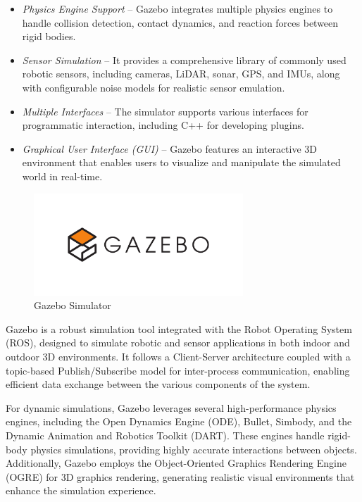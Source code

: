 \documentclass[../../main]{subfiles}
\begin{document}
\begin{itemize}
    \item \emph{Physics Engine Support} – Gazebo integrates multiple physics engines to handle collision detection, contact dynamics, and reaction forces between rigid bodies.
    \item \emph{Sensor Simulation} – It provides a comprehensive library of commonly used robotic sensors, including cameras, LiDAR, sonar, GPS, and IMUs, 
    along with configurable noise models for realistic sensor emulation.
    \item \emph{Multiple Interfaces} – The simulator supports various interfaces for programmatic interaction, including C++ for developing plugins.
    \item \emph{Graphical User Interface (GUI)} – Gazebo features an interactive 3D environment that enables users to visualize and manipulate the simulated world in real-time.
\end{itemize}

\begin{figure}[H]
    \centering
\includegraphics[width=0.7\textwidth]{fig/gazebo_logo.png}
\caption{Gazebo Simulator}
\label{Gazebo logo} %
\end{figure}
\newpage
Gazebo is a robust simulation tool integrated with the Robot Operating System (ROS),
designed to simulate robotic and sensor applications in both indoor and outdoor 3D environments. 
It follows a Client-Server architecture coupled with a topic-based Publish/Subscribe model for inter-process communication, 
enabling efficient data exchange between the various components of the system.

For dynamic simulations, Gazebo leverages several high-performance physics engines, 
including the Open Dynamics Engine (ODE)\cite{smith2016}, Bullet\cite{bullet2016}, Simbody\cite{simbody2016}, and the Dynamic Animation and Robotics Toolkit (DART)\cite{dart2016}. 
These engines handle rigid-body physics simulations, providing highly accurate interactions between objects. 
Additionally, Gazebo employs the Object-Oriented Graphics Rendering Engine (OGRE)\cite{ogre2016} for 3D graphics rendering, 
generating realistic visual environments that enhance the simulation experience.
\end{document}
